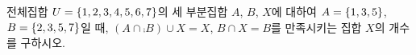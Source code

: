 전체집합 $U=\{1{,}\mkern3mu\mathopen{}2{,}\mkern3mu\mathopen{}3{,}\mkern3mu\mathopen{}4{,}\mkern3mu\mathopen{}5{,}\mkern3mu\mathopen{}6{,}\mkern3mu\mathopen{}7\}$의 세 부분집합 $A$, $B$, $X$에 대하여 $A=\{1{,}\mkern3mu\mathopen{}3{,}\mkern3mu\mathopen{}5\}$, $B=\{2{,}\mkern3mu\mathopen{}3{,}\mkern3mu\mathopen{}5{,}\mkern3mu\mathopen{}7\}$일 때, $(A\cap\comp{B})\cup X=X$, $B\cap X=B$를 만족시키는 집합 $X$의 개수를 구하시오.
